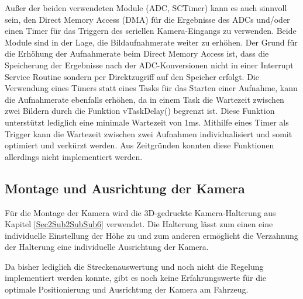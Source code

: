 Außer der beiden verwendeten Module (ADC, SCTimer) kann es auch sinnvoll sein, den Direct Memory Access (DMA) für die Ergebnisse des ADCs und/oder einen Timer für das Triggern des seriellen Kamera-Eingangs zu verwenden. Beide Module sind in der Lage, die Bildaufnahmerate weiter zu erhöhen. Der Grund für die Erhöhung der Aufnahmerate beim Direct Memory Access ist, dass die Speicherung der Ergebnisse nach der ADC-Konversionen nicht in einer Interrupt Service Routine sondern per Direktzugriff auf den Speicher erfolgt. Die Verwendung eines Timers statt eines Tasks für das Starten einer Aufnahme, kann die Aufnahmerate ebenfalls erhöhen, da in einem Task die Wartezeit zwischen zwei Bildern durch die Funktion vTaskDelay() begrenzt ist. Diese Funktion unterstützt lediglich eine minimale Wartezeit von 1ms. Mithilfe eines Timer als Trigger kann die Wartezeit zwischen zwei Aufnahmen individualisiert und somit optimiert und verkürzt werden. Aus Zeitgründen konnten diese Funktionen allerdings nicht implementiert werden. 

\subsection{Montage und Ausrichtung der Kamera}\label{Sec7Sub2}

Für die Montage der Kamera wird die 3D-gedruckte Kamera-Halterung aus Kapitel \ref{Sec2Sub2SubSub6} verwendet. Die Halterung lässt zum einen eine individuelle Einstellung der Höhe zu und zum anderen ermöglicht die Verzahnung der Halterung eine individuelle Ausrichtung der Kamera.\vspace{11pt} 

Da bisher lediglich die Streckenauswertung und noch nicht die Regelung implementiert werden konnte, gibt es noch keine Erfahrungswerte für die optimale Positionierung und Ausrichtung der Kamera am Fahrzeug.


\newpage